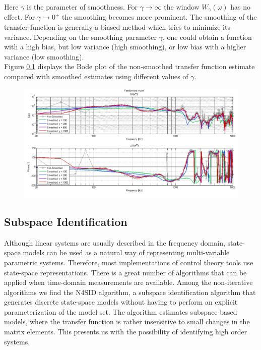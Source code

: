 Here $\gamma$ is the parameter of smoothness. For $\gamma \rightarrow \infty$ the window $W_\gamma(\omega)$ has no effect. For $\gamma \rightarrow 0^+$ the smoothing becomes more prominent. The smoothing of the transfer function is generally a biased method which tries to minimize its variance. Depending on the smoothing parameter $\gamma$, one could obtain a function with a high bias, but low variance (high smoothing), or low bias with a higher variance (low smoothing). \\

Figure \ref{} displays the Bode plot of the non-smoothed transfer function estimate compared with smoothed estimates using different values of $\gamma$.


\begin{figure}[H]
\centering
\includegraphics[width=1.0\textwidth]{pics/FF_Smoothing}
\caption{}
\label{pic:}
\end{figure}



\subsection{Subspace Identification}

Although linear systems are usually described in the frequency domain, state-space models can be used as a natural way of representing multi-variable parametric systems. Therefore, most implementations of control theory tools use state-space representations. There is a great number of algorithms that can be applied when time-domain measurements are available. Among the non-iterative algorithms we find the N4SID algorithm, a subspace identification algorithm that generates discrete state-space models without having to perform an explicit parameterization of the model set. The algorithm estimates subspace-based models, where the transfer function is rather insensitive to small changes in the matrix elements. This presents us with the possibility of identifying high order systems. \\

